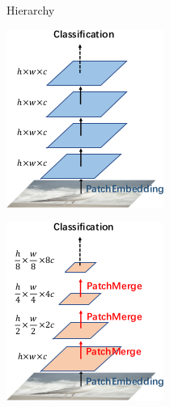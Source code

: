 \documentclass{beamer}
\begin{document}
\begin{frame}{Hierarchy}
    \centering
    \parbox{.4\textwidth}{\centering \includegraphics[width=.4\textwidth]{figures/hierarchy_singlestage.png}}
    \parbox{.4\textwidth}{\centering \includegraphics[width=.4\textwidth]{figures/hierarchy_pyramid.png}}
\end{frame}
\end{document}
